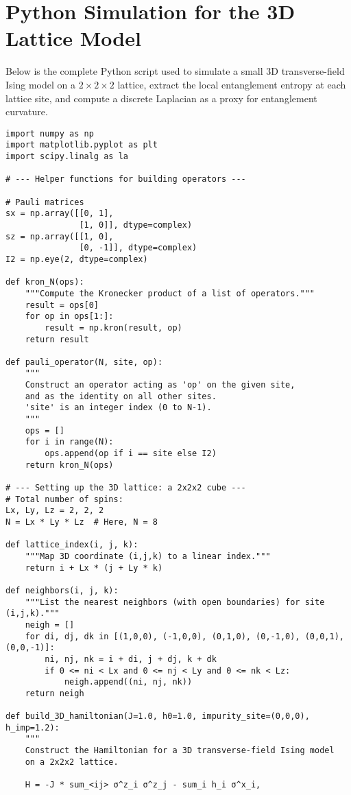 \documentclass[12pt]{article}
\begin{document}
\appendix
\section{Python Simulation for the 3D Lattice Model}
Below is the complete Python script used to simulate a small 3D transverse-field Ising model on a $2\times2\times2$ lattice, extract the local entanglement entropy at each lattice site, and compute a discrete Laplacian as a proxy for entanglement curvature.
\label{appendix:lattice_sim}

\begin{verbatim}
import numpy as np
import matplotlib.pyplot as plt
import scipy.linalg as la

# --- Helper functions for building operators ---

# Pauli matrices
sx = np.array([[0, 1],
               [1, 0]], dtype=complex)
sz = np.array([[1, 0],
               [0, -1]], dtype=complex)
I2 = np.eye(2, dtype=complex)

def kron_N(ops):
    """Compute the Kronecker product of a list of operators."""
    result = ops[0]
    for op in ops[1:]:
        result = np.kron(result, op)
    return result

def pauli_operator(N, site, op):
    """
    Construct an operator acting as 'op' on the given site,
    and as the identity on all other sites.
    'site' is an integer index (0 to N-1).
    """
    ops = []
    for i in range(N):
        ops.append(op if i == site else I2)
    return kron_N(ops)

# --- Setting up the 3D lattice: a 2x2x2 cube ---
# Total number of spins:
Lx, Ly, Lz = 2, 2, 2
N = Lx * Ly * Lz  # Here, N = 8

def lattice_index(i, j, k):
    """Map 3D coordinate (i,j,k) to a linear index."""
    return i + Lx * (j + Ly * k)

def neighbors(i, j, k):
    """List the nearest neighbors (with open boundaries) for site (i,j,k)."""
    neigh = []
    for di, dj, dk in [(1,0,0), (-1,0,0), (0,1,0), (0,-1,0), (0,0,1), (0,0,-1)]:
        ni, nj, nk = i + di, j + dj, k + dk
        if 0 <= ni < Lx and 0 <= nj < Ly and 0 <= nk < Lz:
            neigh.append((ni, nj, nk))
    return neigh

def build_3D_hamiltonian(J=1.0, h0=1.0, impurity_site=(0,0,0), h_imp=1.2):
    """
    Construct the Hamiltonian for a 3D transverse-field Ising model
    on a 2x2x2 lattice.
    
    H = -J * sum_<ij> σ^z_i σ^z_j - sum_i h_i σ^x_i,
    

\end{verbatim}
\end{document}

